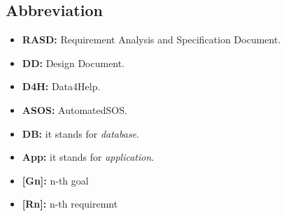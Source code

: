 \subsection{Abbreviation}
\begin{itemize}
	\item {\textbf {RASD:} Requirement Analysis and Specification Document.}
	\item {\textbf {DD:} Design Document.}
	\item {\textbf {D4H:} Data4Help.} 
	\item {\textbf {ASOS:} AutomatedSOS.}
	\item \textbf{DB:} it stands for \textit{database}.
	\item \textbf{App:} it stands for \textit{application}.
	\item {\textbf{[Gn]:} n-th goal}
	\item {\textbf{[Rn]:} n-th requiremnt}
\end{itemize}